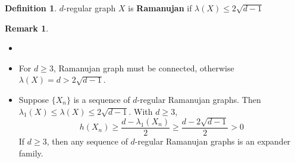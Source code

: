 \documentclass{book}
\newcommand{\define}[1]{\textbf{#1}}
\theoremstyle{definition}
\newtheorem{definition}[lemma]{Definition}
\theoremstyle{remarkstyle}
\newtheorem*{remark}{Remark}%
\begin{document}
\begin{definition}
    $d$-regular graph $X$ is \define{Ramanujan} if $\lambda(X) \le 2\sqrt{d-1} $
\end{definition}
\begin{remark}
\begin{itemize}
    \item[]
    \item For $d \ge 3$, Ramanujan graph must be connected, otherwise $\lambda(X)=d >2\sqrt{d-1} $.
    \item Suppose $\{X_{n}\} $ is a sequence of $d$-regular Ramanujan graphs. Then $\lambda_{1}(X) \le \lambda(X) \le 2\sqrt{d-1} $. With $d\ge3$, $$h(X_{n}) \ge \frac{d-\lambda_{1}(X_{n})}{2} \ge \frac{d-2\sqrt{d-1}}{2} >0 $$ If $d\ge3$, then any sequence of $d$-regular Ramanujan graphs is an expander family. \newline
\end{itemize}
\end{remark}
\end{document}
